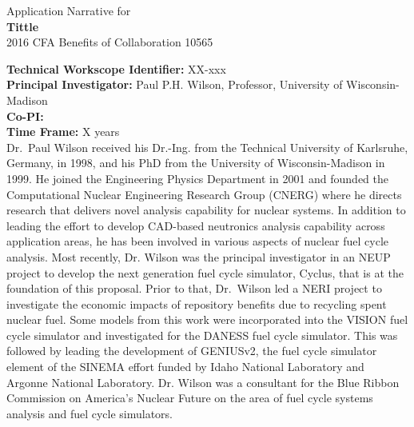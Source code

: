 \documentclass[dvips,12pt]{article}
\begin{document}
\begin{centering}
  Application Narrative for \\
  \textbf{\large Tittle}\\
  2016 CFA Benefits of Collaboration 10565\\
\end{centering}
\vspace{1em}

\noindent\textbf{Technical Workscope Identifier:} XX-xxx\\
\textbf{Principal Investigator:} Paul P.H. Wilson, Professor, University of Wisconsin-Madison\\
\textbf{Co-PI:} \\
\textbf{Time Frame:} X years\\

Dr.\ Paul Wilson received his Dr.-Ing. from the Technical University of
Karlsruhe, Germany, in 1998, and his PhD from the University of
Wisconsin-Madison in 1999. He joined the Engineering Physics
Department in 2001 and founded the Computational Nuclear Engineering
Research Group (CNERG) where he directs research that delivers novel
analysis capability for nuclear systems. In addition to leading the
effort to develop CAD-based neutronics analysis capability across
application areas, he has been involved in various aspects of nuclear
fuel cycle analysis. Most recently, Dr. Wilson was the principal
investigator in an NEUP project to develop the next generation fuel
cycle simulator, Cyclus, that is at the foundation of this proposal.
Prior to that, Dr.\ Wilson led a NERI project to investigate the
economic impacts of repository benefits due to recycling spent nuclear
fuel.  Some models from this work were incorporated into the VISION
fuel cycle simulator and investigated for the DANESS fuel cycle
simulator.  This was followed by leading the development of GENIUSv2,
the fuel cycle simulator element of the SINEMA effort funded by Idaho
National Laboratory and Argonne National Laboratory.  Dr. Wilson was a
consultant for the Blue Ribbon Commission on America’s Nuclear Future
on the area of fuel cycle systems analysis and fuel cycle simulators.



\label{LastPage}
\end{document}
